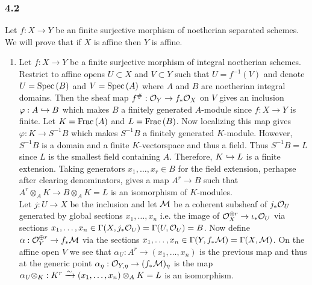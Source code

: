 \documentclass[12pt]{article}
\begin{document}
\subsubsection{4.2}

Let $f : X \to Y$ be an finite surjective morphism of noetherian separated schemes. We will prove that if $X$ is affine then $Y$ is affine.

\begin{enumerate}
\item Let $f : X \to Y$ be a finite surjective morphism of integral noetherian schemes. Restrict to affine opens $U \subset X$ and $V \subset Y$ such that $U = f^{-1}(V)$ and denote $U = \mathrm{Spec}\left( B \right)$ and $V = \mathrm{Spec}\left( A \right)$ where $A$ and $B$ are noetherian integral domains. Then the sheaf map $f^\# : \mathcal{O}_{Y} \to f_* \mathcal{O}_{X}$ on $V$ gives an inclusion $\varphi : A \hookrightarrow B$ which makes $B$ a finitely generated $A$-module since $f : X \to Y$ is finite. Let $K = \mathrm{Frac}\left(A\right)$ and $L = \mathrm{Frac}\left(B\right)$. Now localizing this map gives $\varphi : K \to S^{-1} B$ which makes $S^{-1} B$ a finitely generated $K$-module. However, $S^{-1}B$ is a domain and a finite $K$-vectorspace and thus a field. Thus $S^{-1} B = L$ since $L$ is the smallest field containing $A$. Therefore, $K \hookrightarrow L$ is a finite extension. Taking generators $x_1, \dots, x_r \in B$ for the field extension, perhapse after clearing denominators, gives a map $A^r \to B$ such that $A^r \otimes_A K \to B \otimes_A K = L$ is an isomorphism of $K$-modules.
\bigskip\\
Let $j : U \to X$ be the inclusion and let $\mathcal{M}$ be a coherent subsheaf of $j_* \mathcal{O}_{U}$ generated by global sections $x_1, \dots, x_n$ i.e. the image of $\mathcal{O}_{X}^{\oplus r} \to \iota_* \mathcal{O}_{U}$ via sections $x_1, \dots, x_n \in \Gamma(X, j_* \mathcal{O}_{U}) = \Gamma(U, \mathcal{O}_{U}) = B$.
Now define $\alpha : \mathcal{O}_{Y}^{\oplus r} \to f_* \mathcal{M}$ via the sections $x_1, \dots, x_n \in \Gamma(Y, f_* \mathcal{M}) = \Gamma(X, \mathcal{M})$. On the affine open $V$ we see that $\alpha_U : A^r \to (x_1, \dots, x_n)$ is the previous map and thus at the generic point $\alpha_\eta : \mathcal{O}_{Y, \eta} \to (f_* \mathcal{M})_\eta$ is the map $\alpha_U \otimes_K : K^r \xrightarrow{\sim} (x_1, \dots, x_n) \otimes_A K = L$ is an isomorphism. 


\end{enumerate}
\end{document}

